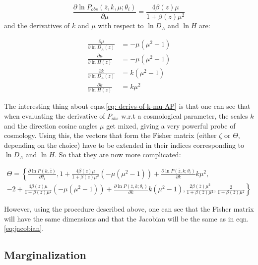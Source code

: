 \begin{equation}
\frac{\partial\ln P_{obs}\left(\bar{z},k,\mu;\theta_{i}\right)}{\partial\mu}=\frac{4\beta(z)\mu}{1+\beta(z)\mu^{2}}
\end{equation}
and the derivatives of $k$ and $\mu$ with respect to $\ln D_{A}$
and $\ln H$ are:

\begin{subequations}

\begin{align}
\frac{\partial\mu}{\partial\ln D_{A}(z)} & =-\mu(\mu^{2}-1)\\
\frac{\partial\mu}{\partial\ln H(z)} & =-\mu(\mu^{2}-1)\\
\frac{\partial k}{\partial\ln D_{A}(z)} & =k(\mu^{2}-1)\\
\frac{\partial k}{\partial\ln H(z)} & =k\mu^{2}
\end{align}


\label{eq: derivs-of-k-mu-AP}\end{subequations}

The interesting thing about eqns.\ref{eq: derivs-of-k-mu-AP} is that
one can see that when evaluating the derivative of $P_{obs}$ w.r.t
a cosmological parameter, the scales $k$ and the direction cosine
angles $\mu$ get mixed, giving a very powerful probe of cosmology.
Using this, the vectors that form the Fisher matrix (either $\zeta$
or $\Theta$, depending on the choice) have to be extended in their
indices corresponding to $\ln D_{A}$ and $\ln H$. So that they are
now more complicated:

\begin{multline}
\Theta=\left\{ \frac{\partial\ln P(k,\bar{z})}{\partial\theta_{i}},1+\frac{4\beta(z)\mu}{1+\beta(z)\mu^{2}}(-\mu(\mu^{2}-1))+\frac{\partial\ln P\left(\bar{z},k;\theta_{i}\right)}{\partial k}k\mu^{2},\right.\\
\left.-2+\frac{4\beta(z)\mu}{1+\beta(z)\mu^{2}}(-\mu(\mu^{2}-1))+\frac{\partial\ln P\left(\bar{z},k;\theta_{i}\right)}{\partial k}k(\mu^{2}-1),\frac{2\beta(\bar{z})\mu^{2}}{1+\beta(\bar{z})\mu^{2}},\frac{2}{1+\beta(\bar{z})\mu^{2}}\right\} 
\end{multline}


However, using the procedure described above, one can see that the
Fisher matrix will have the same dimensions and that the Jacobian
will be the same as in eqn. \ref{eq:jacobian}.


\subsection{Marginalization\label{sec:Marginalization}}

